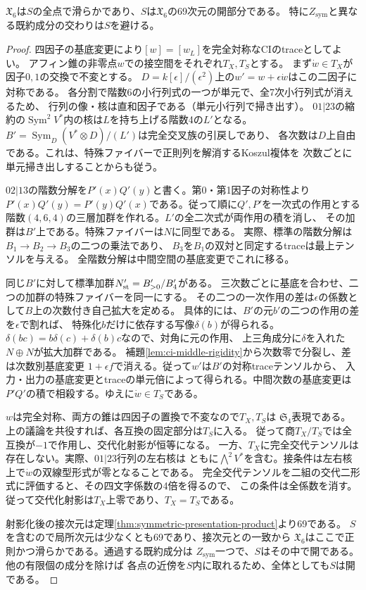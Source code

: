 \begin{theorem}[対称チャートは三階数切断の開部分]\label{thm:symmetric-open-all}
$\mathfrak X_6$は$S$の全点で滑らかであり、$S$は$\mathfrak X_6$の69次元の開部分である。
特に$Z_{\mathrm{sym}}$と異なる既約成分の交わりは$S$を避ける。
\end{theorem}
\begin{proof}
四因子の基底変更により$[w]=[w_L]$を完全対称なCIのtraceとしてよい。
アフィン錐の非零点$w$での接空間をそれぞれ$T_X,T_S$とする。
まず$\dot w\in T_X$が因子$0,1$の交換で不変とする。
$D=k[\epsilon]/(\epsilon^2)$上の$w'=w+\epsilon\dot w$はこの二因子に対称である。
各分割で階数6の小行列式の一つが単元で、全7次小行列式が消えるため、
行列の像・核は直和因子である（単元小行列で掃き出す）。
$01|23$の縮約の$\operatorname{Sym}^2 V^*$内の核は$L$を持ち上げる階数4の$L'$となる。
$B'=\operatorname{Sym}_D(V^*\otimes D)/(L')$は完全交叉族の引戻しであり、
各次数は$D$上自由である。これは、特殊ファイバーで正則列を解消するKoszul複体を
次数ごとに単元掃き出しすることからも従う。

$02|13$の階数分解を$P'(x)Q'(y)$と書く。第0・第1因子の対称性より
$P'(x)Q'(y)=P'(y)Q'(x)$である。従って順に$Q',P'$を一次式の作用とする
階数$(4,6,4)$の三層加群を作れる。$L'$の全二次式が両作用の積を消し、
その加群は$B'$上である。特殊ファイバーは$N$に同型である。
実際、標準の階数分解は$B_1\to B_2\to B_3$の二つの乗法であり、
$B_3$を$B_1$の双対と同定するtraceは最上テンソルを与える。
全階数分解は中間空間の基底変更でこれに移る。

同じ$B'$に対して標準加群$N'_{\rm st}=B'_{>0}/B'_4$がある。
三次数ごとに基底を合わせ、二つの加群の特殊ファイバーを同一にする。
その二つの一次作用の差は$\epsilon$の係数として$B$上の次数付き自己拡大を定める。
具体的には、$B'$の元$b'$の二つの作用の差を$\epsilon$で割れば、
特殊化$b$だけに依存する写像$\delta(b)$が得られる。
$\delta(bc)=b\delta(c)+\delta(b)c$なので、対角に元の作用、
上三角成分に$\delta$を入れた$N\oplus N$が拡大加群である。
補題\ref{lem:ci-middle-rigidity}から次数零で分裂し、差は次数別基底変更
$1+\epsilon f$で消える。従って$w'$は$B'$の対称traceテンソルから、
入力・出力の基底変更とtraceの単元倍によって得られる。中間次数の基底変更は
$P'Q'$の積で相殺する。ゆえに$\dot w\in T_S$である。

$w$は完全対称、両方の錐は四因子の置換で不変なので$T_X,T_S$は
$\mathfrak S_4$表現である。上の議論を共役すれば、各互換の固定部分は$T_S$に入る。
従って商$T_X/T_S$では全互換が$-1$で作用し、交代化射影が恒等になる。
一方、$T_X$に完全交代テンソルは存在しない。実際、$01|23$行列の左右核は
ともに$\bigwedge^2 V^*$を含む。接条件は左右核上で$\dot w$の双線型形式が零となることである。
完全交代テンソルを二組の交代二形式に評価すると、その四文字係数の4倍を得るので、
この条件は全係数を消す。従って交代化射影は$T_X$上零であり、$T_X=T_S$である。

射影化後の接次元は定理\ref{thm:symmetric-presentation-product}より69である。
$S$を含むので局所次元は少なくとも69であり、接次元との一致から
$\mathfrak X_6$はここで正則かつ滑らかである。通過する既約成分は
$Z_{\mathrm{sym}}$一つで、$S$はその中で開である。他の有限個の成分を除けば
各点の近傍を$S$内に取れるため、全体としても$S$は開である。
\end{proof}

